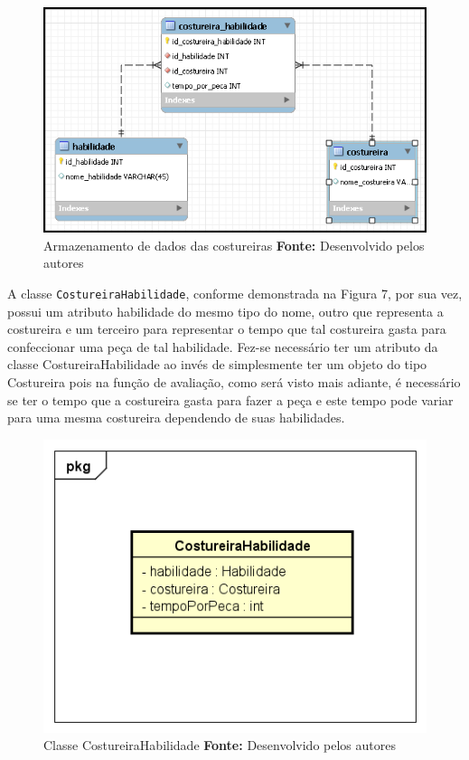 \begin{figure}[h!]
	\centerline{\includegraphics[scale=0.9]{./imagens/costureira_habilidade_tabela.png}}
	\caption[Tabela costureira-habilidade]
	{Armazenamento de dados das costureiras \textbf{Fonte:} Desenvolvido pelos autores}
	\label{fig:exemplo1}
\end{figure}


\par A classe \texttt{CostureiraHabilidade}, conforme demonstrada na Figura 7, por sua vez, possui um atributo habilidade 
do mesmo tipo do nome, outro que representa a costureira e um terceiro para representar o tempo que tal costureira gasta para 
confeccionar uma peça de tal habilidade. Fez-se necessário ter um atributo da classe CostureiraHabilidade ao invés de simplesmente 
ter um objeto do tipo Costureira pois na função de avaliação, como será visto mais adiante, é necessário se ter o tempo que a costureira gasta para fazer a peça e este tempo pode variar para uma mesma costureira dependendo de suas habilidades. 


\begin{figure}[h!]
	\centerline{\includegraphics[scale=0.9]{./imagens/costureiraHabilidade_class.png}}
	\caption[Classe CostureiraHabilidade]
	{Classe CostureiraHabilidade \textbf{Fonte:} Desenvolvido pelos autores}
	\label{fig:exemplo1}
\end{figure}


